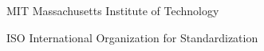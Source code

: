 \begin{siglas}
  \item[MIT] Massachusetts Institute of Technology 
 \item[ISO] International Organization for Standardization
\end{siglas}
